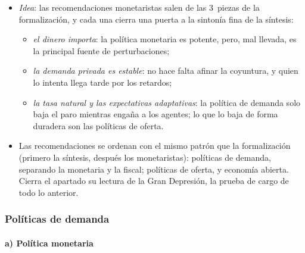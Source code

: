 \documentclass[11pt]{article}
\begin{document}
\begin{itemize}
\item \emph{Idea}: las recomendaciones monetaristas salen de las 3~piezas de la formalización, y cada una cierra una puerta a la sintonía fina de la síntesis:
  \begin{itemize}
  \item \emph{el dinero importa}: la política monetaria es potente, pero, mal llevada, es la principal fuente de perturbaciones;
  \item \emph{la demanda privada es estable}: no hace falta afinar la coyuntura, y quien lo intenta llega tarde por los retardos;
  \item \emph{la tasa natural y las expectativas adaptativas}: la política de demanda solo baja el paro mientras engaña a los agentes; lo que lo baja de forma duradera son las políticas de oferta.
  \end{itemize}
\item Las recomendaciones se ordenan con el mismo patrón que la formalización (primero la síntesis, después los monetaristas): políticas de demanda, separando la monetaria y la fiscal; políticas de oferta, y economía abierta. Cierra el apartado su lectura de la Gran Depresión, la prueba de cargo de todo lo anterior.
\end{itemize}

\subsubsection{Políticas de demanda}\label{sec:politica-demanda}

\paragraph{a) Política monetaria}\label{sec:politica-monetaria}
\end{document}
